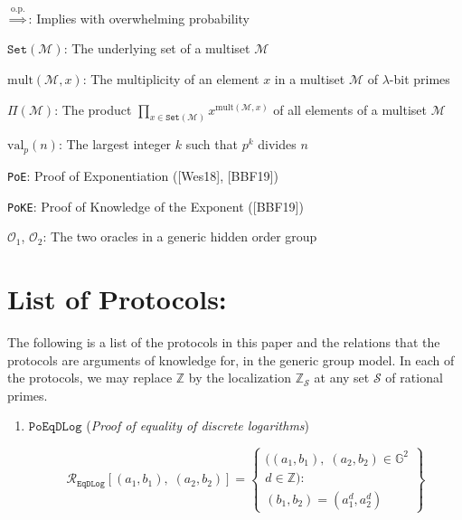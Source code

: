 \documentclass[11pt, lettersize, notitlepage, leqno, footskip=0.6cm]{article}
\newcommand{\bz}{\mathbb Z}
\newcommand{\pl}{\prod\limits}
\newcommand{\ttt}{\texttt}
\newcommand{\sett}{\ttt{Set}}
\newcommand{\mc}{\mathcal}
\newcommand{\mb}{\mathbb}
\newcommand{\mr}{\mathrm}
\newcommand{\lam}{\lambda}
\newcommand{\noin}{\noindent}
\numberwithin{equation}{section}
\begin{document}
{{\noin $\overset{\mr{o.p.}}{\Longrightarrow}$: Implies with overwhelming probability \vspace{0.1cm}

\noin $\sett(\mc{M})$: The underlying set of a multiset $\mc{M}$ \vspace{0.1cm}

\noin $\mr{mult}(\mc{M},x)$: The multiplicity of an element $x$ in a multiset $\mc{M}$ of $\lam$-bit primes \vspace{0.1cm}

\noin $\Pi(\mc{M})$: The product $\pl_{x\in \sett(\mc{M})} x^{\mr{mult}(\mc{M},x)}$ of all elements of a multiset $\mc{M}$ \vspace{0.1cm}

\noin $\mr{val}_p(n)$: The largest integer $k$ such that $p^k$ divides $n$ \vspace{0.1cm}

\noin \verb|PoE|: Proof of Exponentiation ([Wes18], [BBF19])\vspace{0.1cm}

\noin \verb|PoKE|: Proof of Knowledge of the Exponent ([BBF19]) \vspace{0.1cm}

\noin $\mc{O}_1$, $\mc{O}_2$: The two oracles in a generic hidden order group

\section{\fontsize{11}{11}\selectfont List of Protocols:}

The following is a list of the protocols in this paper and the relations that the protocols are arguments of knowledge for, in the generic group model. In each of the protocols, we may replace $\bz$ by the localization $\bz_{\mc{S}}$ at any set $\mc{S}$ of rational primes.

\begin{enumerate}[wide, labelwidth=!, labelindent=0pt]

\item $\ttt{PoEqDLog}$ (\textit{Proof of equality of discrete logarithms}) \vspace{-0.3cm}

\[
  \mc{R}_{{\ttt{EqDLog}}}[(a_1, b_1),\;(a_2,b_2)] = \left\{\begin{array}{l}
    ((a_1, b_1), \; (a_2,b_2)\in\mb{G}^2\\
    d\in\mb{Z}): \\
    (b_1,b_2) = (a_1^d,a_2^d)
  \end{array}\right\}
\]


\end{enumerate}}}
\end{document}
